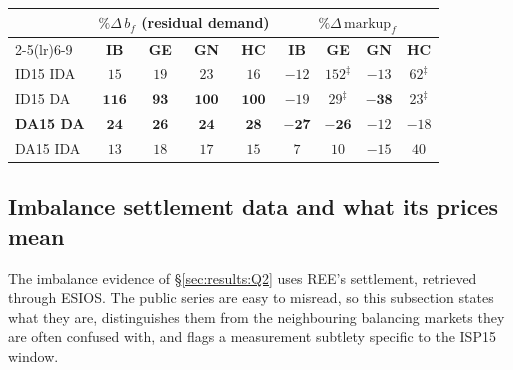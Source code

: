 \documentclass[11pt,a4paper]{article}
\theoremstyle{definition}
\theoremstyle{remark}
\theoremstyle{plain}
\begin{document}
\begin{center}
\footnotesize
\setlength{\tabcolsep}{4pt}
\begin{tabular}{l c c c c c c c c}
\toprule
 & \multicolumn{4}{c}{\textbf{$\%\Delta\, b_f$ (residual demand)}} & \multicolumn{4}{c}{\textbf{$\%\Delta\, \text{markup}_f$}} \\
\cmidrule(lr){2-5}\cmidrule(lr){6-9}
                & \textbf{IB} & \textbf{GE} & \textbf{GN} & \textbf{HC} & \textbf{IB} & \textbf{GE} & \textbf{GN} & \textbf{HC} \\
\midrule
ID15 IDA        & $15$ & $19$ & $23$ & $16$ & $-12$ & $152^{\ddagger}$ & $-13$ & $62^{\ddagger}$ \\
ID15 DA         & $\mathbf{116}$ & $\mathbf{93}$ & $\mathbf{100}$ & $\mathbf{100}$ & $-19$ & $29^{\ddagger}$ & $\mathbf{-38}$ & $23^{\ddagger}$ \\
\textbf{DA15 DA}& $\mathbf{24}$ & $\mathbf{26}$ & $\mathbf{24}$ & $\mathbf{28}$ & $\mathbf{-27}$ & $\mathbf{-26}$ & $-12$ & $-18$ \\
DA15 IDA        & $13$ & $18$ & $17$ & $15$ & $7$ & $10$ & $-15$ & $40$ \\
\bottomrule
\end{tabular}
\label{tab:strategic-markup}
\end{center}

\subsection{Imbalance settlement data and what its prices mean}\label{app:imbalance-data}

The imbalance evidence of \S\ref{sec:results:Q2} uses REE's settlement, retrieved through ESIOS. The public series are easy to misread, so this subsection states what they are, distinguishes them from the neighbouring balancing markets they are often confused with, and flags a measurement subtlety specific to the ISP15 window.
\end{document}
